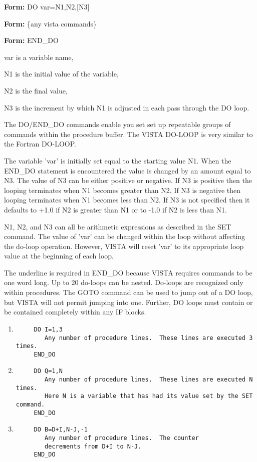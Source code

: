 \begin{command}
  \item[\textbf{Form: } DO var=N1,N2,{[N3]}\hfill]{}
  \item[\textbf{Form: } \{any vista commands\}\hfill]{}
  \item[\textbf{Form: } END\_DO\hfill]{}
  \item[var]{is a variable name,}
  \item[N1]{is the initial value of the variable,}
  \item[N2]{is the final value,}
  \item[N3]{is the increment by which N1 is adjusted in
       each pass through the DO loop.}
\end{command}

The DO/END\_DO commands enable you set set up repeatable groups of commands
within the procedure buffer.  The VISTA DO-LOOP is very similar to the
Fortran DO-LOOP.

The variable 'var' is initially set equal to the starting value N1.  When
the END\_DO statement is encountered the value is changed by an amount
equal to N3. The value of N3 can be either positive or negative. If N3 is
positive then the looping terminates when N1 becomes greater than N2. If N3
is negative then looping terminates when N1 becomes less than N2.  If N3 is
not specified then it defaults to +1.0 if N2 is greater than N1 or to -1.0
if N2 is less than N1.

N1, N2, and N3 can all be arithmetic expressions as described in the SET
command.  The value of 'var' can be changed within the loop without
affecting the do-loop operation.  However, VISTA will reset 'var' to its
appropriate loop value at the beginning of each loop.

The underline is required in END\_DO because VISTA requires commands to be
one word long.  Up to 20 do-loops can be nested.  Do-loops are recognized
only within procedures. The GOTO command can be used to jump out of a DO
loop, but VISTA will not permit jumping into one. Further, DO loops must
contain or be contained completely within any IF blocks.

\begin{enumerate}
  \item{
  \begin{verbatim}
     DO I=1,3
        Any number of procedure lines.  These lines are executed 3 times.
     END_DO
  \end{verbatim}
}
  \item{
  \begin{verbatim}
     DO Q=1,N
        Any number of procedure lines.  These lines are executed N times.
        Here N is a variable that has had its value set by the SET command.
     END_DO
  \end{verbatim}
}
  \item{
  \begin{verbatim}
     DO B=D+I,N-J,-1
        Any number of procedure lines.  The counter
        decrements from D+I to N-J.
     END_DO
  \end{verbatim}
}
\end{enumerate}

